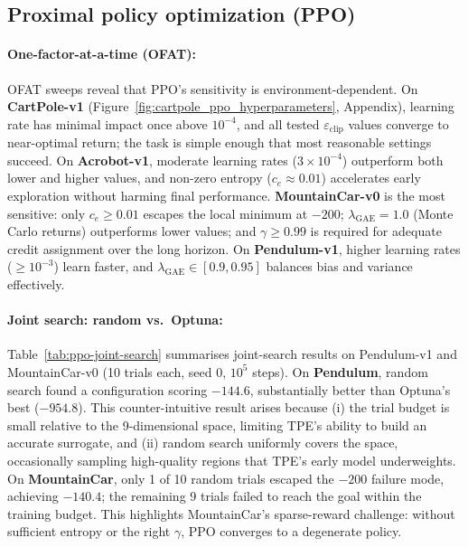 \documentclass{article}
\begin{document}
\subsection{Proximal policy optimization (PPO)}

\paragraph{One-factor-at-a-time (OFAT):}
OFAT sweeps reveal that PPO's sensitivity is environment-dependent.
On \textbf{CartPole-v1} (Figure~\ref{fig:cartpole_ppo_hyperparameters}, Appendix), learning rate has minimal impact once above $10^{-4}$, and all tested $\varepsilon_{\mathrm{clip}}$ values converge to near-optimal return; the task is simple enough that most reasonable settings succeed.
On \textbf{Acrobot-v1}, moderate learning rates ($3{\times}10^{-4}$) outperform both lower and higher values, and non-zero entropy ($c_e \approx 0.01$) accelerates early exploration without harming final performance.
\textbf{MountainCar-v0} is the most sensitive: only $c_e \geq 0.01$ escapes the local minimum at $-200$; $\lambda_{\mathrm{GAE}} = 1.0$ (Monte Carlo returns) outperforms lower values; and $\gamma \geq 0.99$ is required for adequate credit assignment over the long horizon.
On \textbf{Pendulum-v1}, higher learning rates ($\geq 10^{-3}$) learn faster, and $\lambda_{\mathrm{GAE}} \in [0.9, 0.95]$ balances bias and variance effectively.

\paragraph{Joint search: random vs.\ Optuna:}
Table~\ref{tab:ppo-joint-search} summarises joint-search results on Pendulum-v1 and MountainCar-v0 (10 trials each, seed 0, $10^5$ steps).
On \textbf{Pendulum}, random search found a configuration scoring $-144.6$, substantially better than Optuna's best ($-954.8$). This counter-intuitive result arises because (i) the trial budget is small relative to the 9-dimensional space, limiting TPE's ability to build an accurate surrogate, and (ii) random search uniformly covers the space, occasionally sampling high-quality regions that TPE's early model underweights.
On \textbf{MountainCar}, only 1 of 10 random trials escaped the $-200$ failure mode, achieving $-140.4$; the remaining 9 trials failed to reach the goal within the training budget. This highlights MountainCar's sparse-reward challenge: without sufficient entropy or the right $\gamma$, PPO converges to a degenerate policy.
\end{document}
